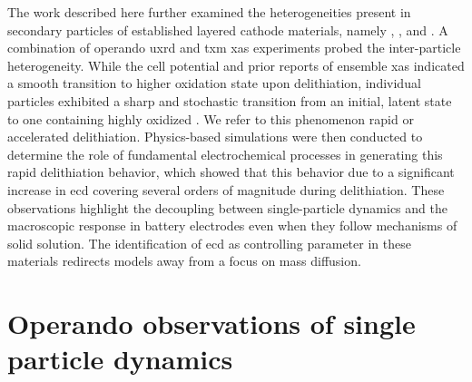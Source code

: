 \documentclass{article}
\begin{document}
The work described here further examined the heterogeneities present
in secondary particles of established layered cathode materials,
namely \nca{}, \nmc[333]{}, and \nmc[532]{}. A combination of operando
\gls{uxrd} and \gls{txm} \gls{xas} experiments probed the
inter-particle heterogeneity. While the cell potential and prior
reports of ensemble \gls{xas} indicated a smooth transition to higher
oxidation state upon delithiation\cite{deb2005,muto2009}, individual
particles exhibited a sharp and stochastic transition from an initial,
latent state to one containing highly oxidized . We refer to
this phenomenon rapid or accelerated delithiation. Physics-based
simulations were then conducted to determine the role of fundamental
electrochemical processes in generating this rapid delithiation
behavior, which showed that this behavior due to a significant
increase in \gls{ecd} covering several orders of magnitude during
delithiation. These observations highlight the decoupling between
single-particle dynamics and the macroscopic response in battery
electrodes even when they follow mechanisms of solid solution. The
identification of \gls{ecd} as controlling parameter in these
materials redirects models away from a focus on mass diffusion.

\section{Operando observations of single particle dynamics}

\end{document}
